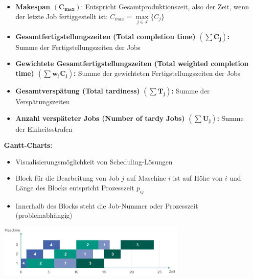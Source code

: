 \begin{itemize}
	\item \textbf{Makespan $\boldsymbol{(C_{max})}$}: Entspricht Gesamtproduktionszeit, also der Zeit, wenn der letzte Job fertiggestellt ist: $C_{max}=\max\limits_{j\in J}\{C_j\}$
	\item \textbf{Gesamtfertigstellungszeiten (Total completion time) $\boldsymbol{(\sum C_j)}$:} Summe der Fertigstellungszeiten der Jobs
	\item \textbf{Gewichtete Gesamtfertigstellungszeiten (Total weighted completion time) $\boldsymbol{(\sum w_jC_j)}$:} Summe der gewichteten Fertigstellungszeiten der Jobs
	\item \textbf{Gesamtverspätung (Total tardiness) $\boldsymbol{(\sum T_j)}$:} Summe der Verspätungszeiten
	\item \textbf{Anzahl verspäteter Jobs (Number of tardy Jobs) $\boldsymbol{(\sum U_j)}$:} Summe der Einheitsstrafen
\end{itemize}
\bigskip
\textbf{Gantt-Charts:}
\begin{itemize}
	\item Visualisierungsmöglichkeit von Scheduling-Lösungen
	\item Block für die Bearbeitung von Job $j$ auf Maschine $i$ ist auf Höhe von
	$i$ und Länge des Blocks entspricht Prozesszeit $p_{ij}$
	\item Innerhalb des Blocks steht die Job-Nummer oder Prozesszeit (problemabhängig)
\end{itemize}
\begin{center}
	\includegraphics[width=0.7\textwidth]{images/gantt.png}
\end{center}

